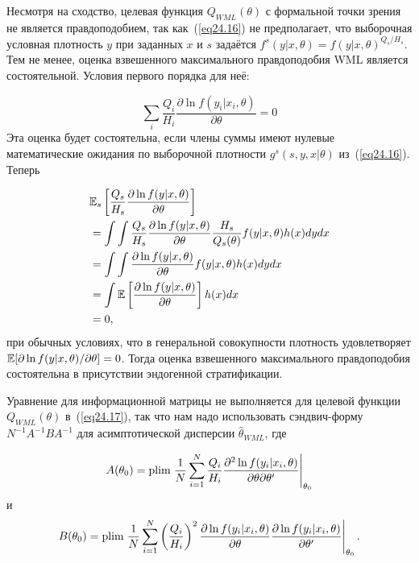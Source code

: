 Несмотря на сходство, целевая функция $Q_{WML}(\theta)$ с формальной точки зрения не является правдоподобием, так как~(\ref{eq24.16}) не предполагает, что выборочная условная плотность $y$ при заданных $x$ и $s$ задаётся $f^s(y|x,\theta) = f(y| x,\theta)^{Q_s/H_s}$. Тем не менее, оценка взвешенного максимального правдоподобия WML является состоятельной. Условия первого порядка для неё:

\begin{equation}
\label{eq24.18}
\sum_i \frac{Q_i}{H_i} \frac{\partial \ln{f(y_i|x_i,\theta)}}{\partial \theta} = 0
\end{equation}
Эта оценка будет состоятельна, если члены суммы имеют нулевые математические ожидания по выборочной плотности $g^s(s,y,x|\theta)$ из~(\ref{eq24.16}). Теперь

\begin{align}
\label{eq24.19}
&\mathbb{E}_s \left[ \frac{Q_s}{H_s} \frac{\partial \ln f(y|x,\theta)}{\partial \theta} \right] \nonumber \\
&=\int \int  \frac{Q_s}{H_s} \frac{\partial \ln f(y|x,\theta)}{\partial \theta} \frac{H_s}{Q_s(\theta)}f(y|x,\theta)h(x)dydx  \nonumber \\
&=\int \int  \frac{\partial \ln f(y|x,\theta)}{\partial \theta} f(y|x,\theta)h(x)dydx \nonumber \\
&=\int \mathbb{E} \left[\frac{\partial \ln f(y|x,\theta)}{\partial \theta} \right] h(x) dx \nonumber \\
&=0,
\end{align}
при обычных условиях, что в генеральной совокупности плотность удовлетворяет $\mathbb{E}[\partial \ln f(y|x,\theta) / \partial \theta] = 0$. Тогда оценка взвешенного максимального правдоподобия состоятельна в присутствии эндогенной стратификации. 

Уравнение для информационной матрицы не выполняется для целевой функции $Q_{WML}(\theta)$ в~(\ref{eq24.17}), так что нам надо использовать сэндвич-форму $N^{-1}A^{-1}BA^{-1}$ для асимптотической дисперсии $\hat \theta_{WML}$, где

\begin{equation}
\label{eq24.20}
A(\theta_0) = \mathrm{plim } \left. \frac{1}{N} \sum_{i=1}^N \frac{Q_i}{H_i} \frac{\partial^2 \ln f(y_i|x_i, \theta)}{\partial \theta \partial \theta'} \right|_{\theta_0}
\end{equation}
и
\begin{equation}
\label{eq24.21}
B(\theta_0) = \mathrm{plim } \left. \frac{1}{N} \sum_{i=1}^N \left( {\frac{Q_i}{H_i}} \right) ^2 \frac{\partial \ln f(y_i|x_i, \theta)}{\partial \theta} \frac{\partial \ln f(y_i|x_i, \theta)}{\partial \theta'}  \right|_{\theta_0}.
\end{equation}

